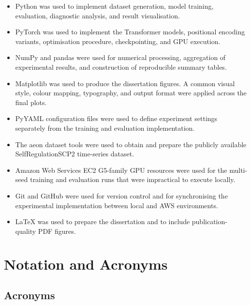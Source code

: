 \documentclass[
    author={Aanchala Ravindra Bhongade},
    supervisor={Dr. Fernando Moreno-Pino},
    degree={MSc},
    title={Length Generalisation in Transformer-Based Sequence Models: Failure Taxonomy and Mitigation Strategies},
    subtitle={},
    type={},
    year={2026}
]{dissertation}
\begin{document}
\begin{itemize}
    \item Python was used to implement dataset generation, model training, evaluation, diagnostic analysis, and result visualisation.

    \item PyTorch was used to implement the Transformer models, positional encoding variants, optimisation procedure, checkpointing, and GPU execution.

    \item NumPy and pandas were used for numerical processing, aggregation of experimental results, and construction of reproducible summary tables.

    \item Matplotlib was used to produce the dissertation figures. A common visual style, colour mapping, typography, and output format were applied across the final plots.

    \item PyYAML configuration files were used to define experiment settings separately from the training and evaluation implementation.

    \item The aeon dataset tools were used to obtain and prepare the publicly available SelfRegulationSCP2 time-series dataset.

    \item Amazon Web Services EC2 G5-family GPU resources were used for the multi-seed training and evaluation runs that were impractical to execute locally.

    \item Git and GitHub were used for version control and for synchronising the experimental implementation between local and AWS environments.

    \item LaTeX was used to prepare the dissertation and to include publication-quality PDF figures.
\end{itemize}

\chapter*{Notation and Acronyms}

\section*{Acronyms}
\end{document}
